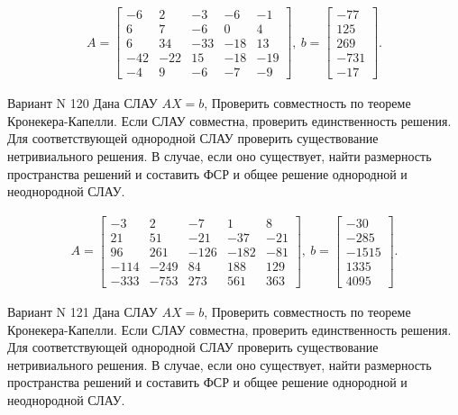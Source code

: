 \documentclass[11pt]{report}
\begin{document}
\begin{align*}
 A = \left[\begin{matrix}-6 & 2 & -3 & -6 & -1\\6 & 7 & -6 & 0 & 4\\6 & 34 & -33 & -18 & 13\\-42 & -22 & 15 & -18 & -19\\-4 & 9 & -6 & -7 & -9\end{matrix}\right],
\ b = \left[\begin{matrix}-77\\125\\269\\-731\\-17\end{matrix}\right]. 
 \end{align*}

Вариант N 120
Дана СЛАУ $AX = b$,
Проверить совместность по теореме Кронекера-Капелли. Если СЛАУ совместна, проверить единственность решения.
Для соответствующей однородной СЛАУ проверить существование нетривиального решения. В случае, если оно существует,
найти размерность пространства решений и составить ФСР и общее решение однородной  и неоднородной СЛАУ.


\begin{align*}
 A = \left[\begin{matrix}-3 & 2 & -7 & 1 & 8\\21 & 51 & -21 & -37 & -21\\96 & 261 & -126 & -182 & -81\\-114 & -249 & 84 & 188 & 129\\-333 & -753 & 273 & 561 & 363\end{matrix}\right],
\ b = \left[\begin{matrix}-30\\-285\\-1515\\1335\\4095\end{matrix}\right]. 
 \end{align*}

Вариант N 121
Дана СЛАУ $AX = b$,
Проверить совместность по теореме Кронекера-Капелли. Если СЛАУ совместна, проверить единственность решения.
Для соответствующей однородной СЛАУ проверить существование нетривиального решения. В случае, если оно существует,
найти размерность пространства решений и составить ФСР и общее решение однородной  и неоднородной СЛАУ.
\end{document}
